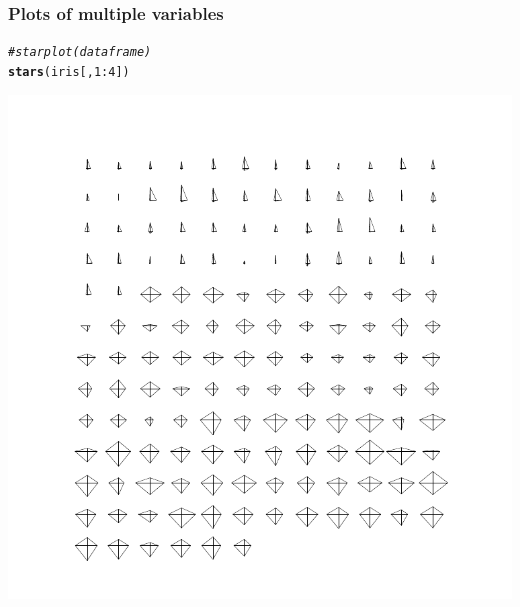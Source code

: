 \documentclass[12pt]{beamer}\usepackage[]{graphicx}\usepackage[]{color}
\makeatletter
\newcommand{\hlnum}[1]{\textcolor[rgb]{0.686,0.059,0.569}{#1}}%
\newcommand{\hlcom}[1]{\textcolor[rgb]{0.678,0.584,0.686}{\textit{#1}}}%
\newcommand{\hlopt}[1]{\textcolor[rgb]{0,0,0}{#1}}%
\newcommand{\hlstd}[1]{\textcolor[rgb]{0.345,0.345,0.345}{#1}}%
\newcommand{\hlkwd}[1]{\textcolor[rgb]{0.737,0.353,0.396}{\textbf{#1}}}%
\newenvironment{kframe}{%
 \def\at@end@of@kframe{}%
 \ifinner\ifhmode%
  \def\at@end@of@kframe{\end{minipage}}%
  \begin{minipage}{\columnwidth}%
 \fi\fi%
 \def\FrameCommand##1{\hskip\@totalleftmargin \hskip-\fboxsep
 \colorbox{shadecolor}{##1}\hskip-\fboxsep
     \hskip-\linewidth \hskip-\@totalleftmargin \hskip\columnwidth}%
 \MakeFramed {\advance\hsize-\width
   \@totalleftmargin\z@ \linewidth\hsize
   \@setminipage}}%
 {\par\unskip\endMakeFramed%
 \at@end@of@kframe}
\newenvironment{knitrout}{}{} %
\makeatother
\begin{document}
\begin{frame}[fragile]
\frametitle{Plots of multiple variables}
\begin{knitrout}\footnotesize
{}\color{fgcolor}\begin{kframe}
\begin{alltt}
\hlcom{# star plot (data frame)}
\hlkwd{stars}\hlstd{(iris[ ,} \hlnum{1}\hlopt{:}\hlnum{4}\hlstd{])}
\end{alltt}
\end{kframe}

{\centering \includegraphics[width=.6\linewidth,height=.6\linewidth]{figure/unnamed-chunk-24-1} 

}



\end{knitrout}
\end{frame}

\end{document}
